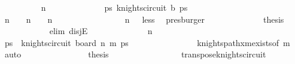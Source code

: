 \begin{isabellebody}
\ \ \ \ \ \ \ \ \isamarkupfalse%
\ {\isachardoublequoteopen}n{\isacharminus}{\kern0pt}{}\ {\isasymge}\ {}{\isachardoublequoteclose}\isanewline
\ \ \ \ \ \ \ \ \isamarkupfalse%
\ \isamarkupfalse%
\ {\isachardoublequoteopen}{\isasymexists}ps{\isachardot}{\kern0pt}\ knights{\isacharunderscore}{\kern0pt}circuit\ {\isacharquery}{\kern0pt}b\ ps{\isachardoublequoteclose}\isanewline
\ \ \ \ \ \ \ \ \isamarkupfalse%
\ {\isacharminus}{\kern0pt}\isanewline
\ \ \ \ \ \ \ \ \ \ \isamarkupfalse%
\ {\isachardoublequoteopen}n{\isacharminus}{\kern0pt}{}\ {\isacharequal}{\kern0pt}\ {}\ {\isasymor}\ n{\isacharminus}{\kern0pt}{}\ {\isacharequal}{\kern0pt}\ {}\ {\isasymor}\ n{\isacharminus}{\kern0pt}{}\ {\isasymge}\ {}{}{\isachardoublequoteclose}\ \isanewline
\ \ \ \ \ \ \ \ \ \ \ \ \isamarkupfalse%
\ {\isacartoucheopen}n{\isacharminus}{\kern0pt}{}\ {\isasymge}\ {}{\isacartoucheclose}\ less\ \isamarkupfalse%
\ presburger\isanewline
\ \ \ \ \ \ \ \ \ \ \isamarkupfalse%
\ \isamarkupfalse%
\ {\isacharquery}{\kern0pt}thesis\isanewline
\ \ \ \ \ \ \ \ \ \ \isamarkupfalse%
\ {\isacharparenleft}{\kern0pt}elim\ disjE{\isacharparenright}{\kern0pt}\isanewline
\ \ \ \ \ \ \ \ \ \ \ \ \isamarkupfalse%
\ {\isachardoublequoteopen}n{\isacharminus}{\kern0pt}{}\ {\isacharequal}{\kern0pt}\ {}{\isachardoublequoteclose}\isanewline
\ \ \ \ \ \ \ \ \ \ \ \ \isamarkupfalse%
\ \isamarkupfalse%
\ ps\ \ {\isachardoublequoteopen}knights{\isacharunderscore}{\kern0pt}circuit\ {\isacharparenleft}{\kern0pt}board\ {\isacharparenleft}{\kern0pt}n{\isacharminus}{\kern0pt}{}{\isacharparenright}{\kern0pt}\ m{\isacharparenright}{\kern0pt}\ ps{\isachardoublequoteclose}\isanewline
\ \ \ \ \ \ \ \ \ \ \ \ \ \ \isamarkupfalse%
\ knights{\isacharunderscore}{\kern0pt}path{\isacharunderscore}{\kern0pt}{}xm{\isacharunderscore}{\kern0pt}exists{\isacharbrackleft}{\kern0pt}of\ m{\isacharbrackright}{\kern0pt}\ \isamarkupfalse%
\ auto\isanewline
\ \ \ \ \ \ \ \ \ \ \ \ \isamarkupfalse%
\ \isamarkupfalse%
\ {\isacharquery}{\kern0pt}thesis\ \isanewline
\ \ \ \ \ \ \ \ \ \ \ \ \ \ \isamarkupfalse%
\ transpose{\isacharunderscore}{\kern0pt}knights{\isacharunderscore}{\kern0pt}circuit\ \isamarkupfalse%

\end{isabellebody}
